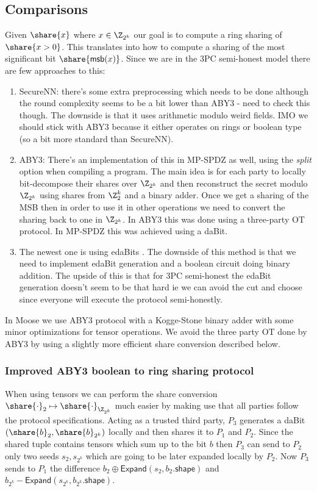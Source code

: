 \subsection{Comparisons}
Given $\share{x}$ where $x \in \Z_{2^k}$ our goal is to compute a ring sharing of $\share{x > 0}$.
This translates into how to compute a sharing of the most significant bit $\share{\mathsf{msb}(x)}$.
Since we are in the 3PC semi-honest model there are few approaches to this:
\begin{enumerate}

   \item SecureNN: there's some extra preprocessing which needs to be done
   although the round complexity seems to be a bit lower than ABY3 - need to
   check this though. The downside is that it uses arithmetic modulo weird
   fields. IMO we should stick with ABY3 because it either operates on rings
   or boolean type (so a bit more standard than SecureNN).
   \item ABY3:
   There's an implementation of this in MP-SPDZ as well, using
   the \textit{split} option when compiling a program. The main idea is for
   each party to locally bit-decompose their shares over $\Z_{2^k}$ and then
   reconstruct the secret modulo $\Z_{2^k}$ using shares from $\Z^k_2$ and a
   binary adder. Once we get a sharing of the MSB then in order to use it in
   other operations we need to convert the sharing back to one in $\Z_{2^k}$.
   In ABY3 this was done using a three-party OT protocol. In MP-SPDZ this was
   achieved using a daBit.
  \item The newest one is using edaBits \cite{C:EGKRS20}. The downside of
   this method is that we need to implement edaBit generation and a boolean
   circuit doing binary addition. The upside of this is that for 3PC
   semi-honest the edaBit generation doesn't seem to be that hard ie
   we can avoid the cut and choose since everyone will execute the protocol
   semi-honestly.
\end{enumerate}

\noindent In Moose we use ABY3 protocol with a Kogge-Stone binary adder with
some minor optimizations for tensor operations. We avoid the three party OT
done by ABY3 by using a slightly more efficient share conversion described
below.

\subsubsection{Improved ABY3 boolean to ring sharing protocol}
When using tensors we can perform the share conversion $\share{\cdot}_2
\mapsto \share{\cdot}_{\Z_{2^k}}$ much easier by making use that all parties
follow the protocol specifications.
Acting as a trusted third party, $P_3$ generates a
daBit $(\share{b}_2, \share{b}_{2^k})$ locally and then shares it to $P_1$ and $P_2$.
Since the shared tuple contains tensors which sum up to the bit $b$ then $P_3$ can
send to $P_2$ only two seeds $s_2, s_{2^k}$ which are going to be later expanded
locally by $P_2$. Now $P_3$ sends to $P_1$ the difference $b_2 \oplus
\mathsf{Expand}(s_2, b_2.\mathsf{shape})$ and $b_{2^k} -
\mathsf{Expand}(s_{2^k}, b_{2^k}.\mathsf{shape})$.

